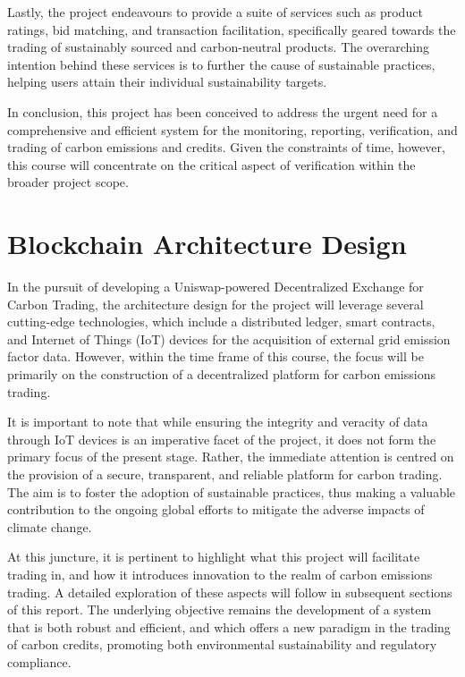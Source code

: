 \documentclass[sigconf, authordraft]{acmart}
\begin{document}
	Lastly, the project endeavours to provide a suite of services such as product ratings,
	bid matching, and transaction facilitation, specifically geared towards the
	trading of sustainably sourced and carbon-neutral products. The overarching intention
	behind these services is to further the cause of sustainable practices,
	helping users attain their individual sustainability targets.

	In conclusion, this project has been conceived to address the urgent need for a
	comprehensive and efficient system for the monitoring, reporting, verification,
	and trading of carbon emissions and credits. Given the constraints of time,
	however, this course will concentrate on the critical aspect of verification within
	the broader project scope.

	\section{Blockchain Architecture Design}


	In the pursuit of developing a Uniswap-powered Decentralized Exchange for Carbon
	Trading, the architecture design for the project will leverage several cutting-edge
	technologies, which include a distributed ledger, smart contracts, and Internet
	of Things (IoT) devices for the acquisition of external grid emission factor data.
	However, within the time frame of this course, the focus will be primarily on
	the construction of a decentralized platform for carbon emissions trading.

	It is important to note that while ensuring the integrity and veracity of data
	through IoT devices is an imperative facet of the project, it does not form the
	primary focus of the present stage. Rather, the immediate attention is centred
	on the provision of a secure, transparent, and reliable platform for carbon trading.
	The aim is to foster the adoption of sustainable practices, thus making a valuable
	contribution to the ongoing global efforts to mitigate the adverse impacts of climate
	change.

	At this juncture, it is pertinent to highlight what this project will
	facilitate trading in, and how it introduces innovation to the realm of carbon
	emissions trading. A detailed exploration of these aspects will follow in
	subsequent sections of this report. The underlying objective remains the development
	of a system that is both robust and efficient, and which offers a new paradigm
	in the trading of carbon credits, promoting both environmental sustainability and
	regulatory compliance.
\end{document}
